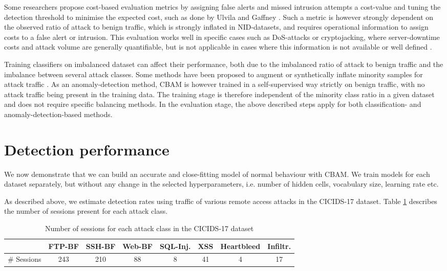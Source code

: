 Some researchers propose cost-based evaluation metrics by assigning false alerts and missed intrusion attempts a cost-value and tuning the detection threshold to minimise the expected cost, such as done by Ulvila and Gaffney \cite{ulvila2003evaluation}. Such a metric is however strongly dependent on the observed ratio of attack to benign traffic, which is strongly inflated in NID-datasets, and requires operational information to assign costs to a false alert or intrusion. This evaluation works well in specific cases such as DoS-attacks or cryptojacking, where server-downtime costs and attack volume are generally quantifiable, but is not applicable in cases where this information is not available or well defined \cite{milenkoski2015evaluating}. 

Training classifiers on imbalanced dataset can affect their performance, both due to the imbalanced ratio of attack to benign traffic and the imbalance between several attack classes. Some methods have been proposed to augment or synthetically inflate minority samples for attack traffic \cite{liu2020intrusion}. As an anomaly-detection method, CBAM is however trained in a self-supervised way strictly on benign traffic, with no attack traffic being present in the training data. The training stage is therefore independent of the minority class ratio in a given dataset and does not require specific balancing methods. In the evaluation stage, the above described steps apply for both classification- and anomaly-detection-based methods.


\section{Detection performance}\label{Sec:Det}

We now demonstrate that we can build an accurate and close-fitting model of normal behaviour with CBAM. We train models for each dataset separately, but without any change in the selected hyperparameters, i.e. number of hidden cells, vocabulary size, learning rate etc. 

As described above, we estimate detection rates using traffic of various remote access attacks in the CICIDS-17 dataset. Table \ref{tab:Attackdata} describes the number of sessions present for each attack class.

\begin{table}[ht]
\centering
\begin{tabular}{l|ccccccc}
&FTP-BF&SSH-BF&Web-BF&SQL-Inj.&XSS&Heartbleed&Infiltr.\\
\hline
\# Sessions&243&210&88&8&41&4&17\\[0.2cm]
\end{tabular}
\vspace{2pt}
\caption{Number of sessions for each attack class in the CICIDS-17 dataset}\label{tab:Attackdata}
\end{table}

